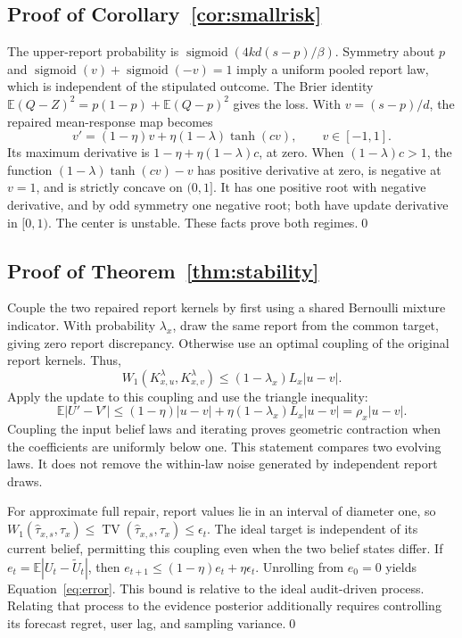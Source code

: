 \documentclass[10pt]{article}
\newcommand{\E}{\mathbb E}
\newcommand{\TV}{\operatorname{TV}}
\newcommand{\sig}{\operatorname{sigmoid}}
\begin{document}
\subsection{Proof of Corollary~\ref{cor:smallrisk}}
The upper-report probability is $\sig(4kd(s-p)/\beta)$.
Symmetry about $p$ and $\sig(v)+\sig(-v)=1$ imply a uniform
pooled report law, which is independent of the stipulated outcome.
The Brier identity $\E(Q-Z)^2=p(1-p)+\E(Q-p)^2$ gives the loss.
With $v=(s-p)/d$, the repaired mean-response map becomes
\[
 v'=(1-\eta)v+\eta(1-\lambda)\tanh(cv),\qquad v\in[-1,1].
\]
Its maximum derivative is $1-\eta+\eta(1-\lambda)c$, at zero.
When $(1-\lambda)c>1$, the function
$(1-\lambda)\tanh(cv)-v$ has positive derivative at zero,
is negative at $v=1$, and is strictly concave on $(0,1]$.
It has one positive root with negative derivative, and by odd symmetry
one negative root; both have update derivative in $[0,1)$.
The center is unstable. These facts prove both regimes.\qed

\subsection{Proof of Theorem~\ref{thm:stability}}
Couple the two repaired report kernels by first using a shared Bernoulli
mixture indicator. With probability $\lambda_x$, draw the same report
from the common target, giving zero report discrepancy. Otherwise use an
optimal coupling of the original report kernels. Thus,
\begin{equation}
 W_1(K^\lambda_{x,u},K^\lambda_{x,v})
 \le(1-\lambda_x)L_x|u-v|.
\end{equation}
Apply the update to this coupling and use the triangle inequality:
\begin{equation}
 \E|U'-V'|\le(1-\eta)|u-v|+
  \eta(1-\lambda_x)L_x|u-v|=\rho_x|u-v|.
\end{equation}
Coupling the input belief laws and iterating proves geometric contraction
when the coefficients are uniformly below one. This statement compares
two evolving laws. It does not remove the within-law noise generated by
independent report draws.

For approximate full repair, report values lie in an interval of diameter
one, so $W_1(\widehat\tau_{x,s},\tau_x)\le
\TV(\widehat\tau_{x,s},\tau_x)\le\epsilon_t$.
The ideal target is independent of its current belief, permitting this
coupling even when the two belief states differ. If
$e_t=\E|U_t-\widetilde U_t|$, then
$e_{t+1}\le(1-\eta)e_t+\eta\epsilon_t$.
Unrolling from $e_0=0$ yields Equation~\eqref{eq:error}. This bound is
relative to the ideal audit-driven process. Relating that process to the
evidence posterior additionally requires controlling its forecast regret,
user lag, and sampling variance.\qed
\end{document}
